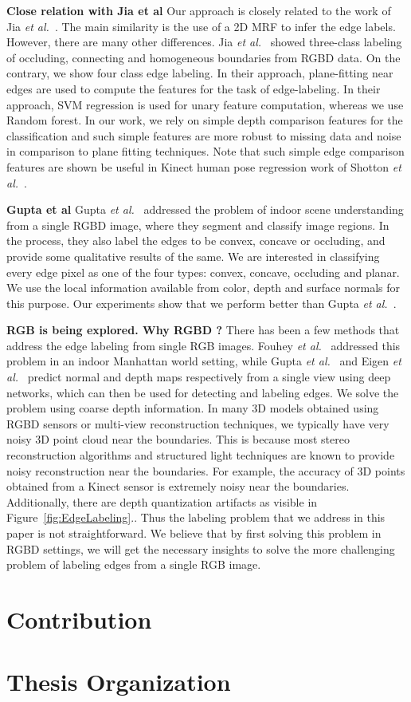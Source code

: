 \textbf{Close relation with Jia et al}
Our approach is closely related to the work of Jia \textit{et al.}~\cite{depthorder}. The main 
similarity is the use of a 2D MRF to infer the edge labels. However, there are many other 
differences. Jia \textit{et al.}~\cite{depthorder} showed three-class labeling of occluding, connecting and 
homogeneous boundaries from RGBD data. On the contrary, we show four class edge labeling. In their 
approach, plane-fitting near edges are used to compute the features for the task of edge-labeling. 
In their approach, SVM regression is used for unary feature computation, whereas we use Random 
forest. In our work, we rely on simple depth comparison features for the classification and such simple 
features are more robust to missing data and noise in comparison to plane fitting techniques. Note that 
such simple edge comparison features are shown be useful in Kinect human pose regression work of 
Shotton \textit{et al.}~\cite{newcombe2011kinectfusion}.

\textbf{Gupta et al}
Gupta \textit{et al.}~\cite{gupta13Perceptual} addressed the problem of indoor scene understanding
from a single RGBD image, where they segment and classify image regions. In the process, they also 
label the edges to be convex, concave or occluding, and provide some qualitative results of the same. 
We are interested in classifying every edge pixel as one of the four types: convex, concave,
occluding and planar. We use the local information available from color, depth and surface
normals for this purpose. Our experiments show that we perform better than 
Gupta \textit{et al.}~\cite{gupta13Perceptual}.

\textbf{RGB is being explored. Why RGBD ?}
There has been a few methods that address the edge labeling from single RGB images. 
Fouhey \textit{et al.}~\cite{Fouhey14c} addressed this problem in an indoor Manhattan world setting, 
while Gupta \textit{et al.}~\cite{Fouhey14c} and Eigen \textit{et al.}~\cite{Eigen2014} predict normal 
and depth maps respectively from a single view using deep networks, which can then be used for 
detecting and labeling edges. 
We solve the problem using coarse depth information. In many 3D models obtained using RGBD sensors 
or multi-view reconstruction techniques, we typically have very noisy 3D point cloud near the 
boundaries. This is because most stereo reconstruction algorithms and structured light techniques 
are known to provide noisy reconstruction near the boundaries. For example, the accuracy of 3D 
points obtained from a Kinect sensor is extremely noisy near the boundaries. 
Additionally, there are depth quantization artifacts as visible in Figure~\ref{fig:EdgeLabeling}.. Thus the labeling 
problem that we address in this paper is not straightforward. We believe 
that by first solving this problem in RGBD settings, we will get the necessary insights to 
solve the more challenging problem of labeling edges from a single RGB image.

\section{Contribution}
\section{Thesis Organization}

